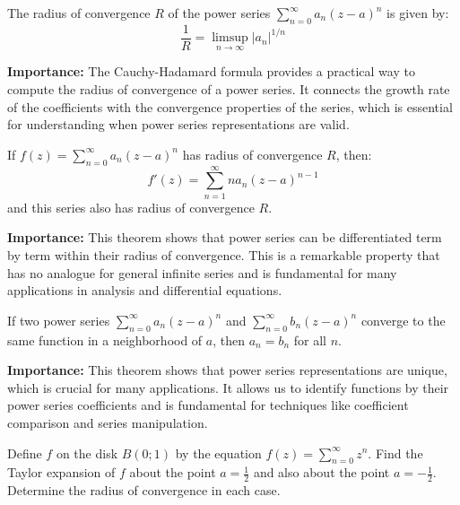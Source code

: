 \begin{theorem}
The radius of convergence $R$ of the power series $\sum_{n=0}^{\infty} a_n(z-a)^n$ is given by:
\[\frac{1}{R} = \limsup_{n \to \infty} |a_n|^{1/n}\]
\end{theorem}

\noindent\textbf{Importance:} The Cauchy-Hadamard formula provides a practical way to compute the radius of convergence of a power series. It connects the growth rate of the coefficients with the convergence properties of the series, which is essential for understanding when power series representations are valid.



\begin{theorem}
If $f(z) = \sum_{n=0}^{\infty} a_n(z-a)^n$ has radius of convergence $R$, then:
\[f'(z) = \sum_{n=1}^{\infty} n a_n(z-a)^{n-1}\]
and this series also has radius of convergence $R$.
\end{theorem}

\noindent\textbf{Importance:} This theorem shows that power series can be differentiated term by term within their radius of convergence. This is a remarkable property that has no analogue for general infinite series and is fundamental for many applications in analysis and differential equations.



\begin{theorem}
If two power series $\sum_{n=0}^{\infty} a_n(z-a)^n$ and $\sum_{n=0}^{\infty} b_n(z-a)^n$ converge to the same function in a neighborhood of $a$, then $a_n = b_n$ for all $n$.
\end{theorem}

\noindent\textbf{Importance:} This theorem shows that power series representations are unique, which is crucial for many applications. It allows us to identify functions by their power series coefficients and is fundamental for techniques like coefficient comparison and series manipulation.





\begin{problembox}
\begin{problemstatement}
Define \( f \) on the disk \( B(0; 1) \) by the equation \( f(z) = \sum_{n=0}^{\infty} z^n \). Find the Taylor expansion of \( f \) about the point \( a = \frac{1}{2} \) and also about the point \( a = -\frac{1}{2} \). Determine the radius of convergence in each case.
\end{problemstatement}
\end{problembox}

